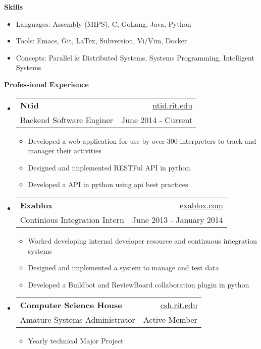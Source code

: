 \documentclass[letterpaper,11pt]{article}
\makeatletter
\newcommand{\resheading}[1]{{\large \colorbox{mygrey}{\begin{minipage}{\textwidth}{\textbf{#1 \vphantom{p\^{E}}}}\end{minipage}}}}
\newcommand{\ressubheading}[4]{
\begin{tabular*}{6.5in}{l@{\extracolsep{\fill}}r}
		\textbf{#1} & #2 \\
		{#3} & {#4} \\
\end{tabular*}\vspace{-6pt}}
\makeatother
\begin{document}
\resheading{{Skills}}
{ \footnotesize
		\begin{itemize}
			\item{Languages: Assembly (MIPS), C, GoLang, Java, Python}
			\item{Tools: Emacs, Git, LaTex, Subversion, Vi/Vim, Docker}
			\item{Concepts: Parallel \& Distributed Systems, Systems Programming, Intelligent Systems}
		\end{itemize}
}
\resheading{Professional Experience}
{\footnotesize
	\begin{itemize}
               \item
                        \ressubheading{Ntid}{\href{http://www.ntid.rit.edu/}{ntid.rit.edu}}{Backend Software Enginer}{June 2014 - Current}
                        { \footnotesize
                                \begin{itemize}
                                  \item{Developed a web application for use by over 300 interpreters to track and manager their activities}
                                  \item{Designed and implemented RESTFul API in python. }
                                  \item{Developed a API in python using api best practices}
                                \end{itemize}
                        }


	       \item
			\ressubheading{Exablox}{\href{http://www.exablox.com/}{exablox.com}}{Continious Integration Intern}{June 2013 - January 2014}
			{ \footnotesize
				\begin{itemize}
                                  \item{Worked developing internal developer resource and continuous integration systems}
				  \item{Designed and implemented a system to manage and  test data}
				  \item{Developed a Buildbot and ReviewBoard collaboration plugin in python}
				\end{itemize}
			}
		\item	
			\ressubheading{Computer Science House}{\href{http://www.csh.rit.edu/}{csh.rit.edu}}{Amature Systems Administrator}{Active Member} 
			{ \footnotesize
				\begin{itemize}		
					\item{Yearly technical Major Project}
				\end{itemize}
			}		
	\end{itemize}  %
}
\end{document}
